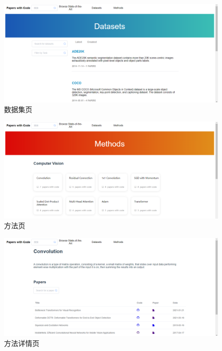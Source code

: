 \begin{figure}[htbp!]
    \centering
    \includegraphics[width=\textwidth]{figures/dataset.png}
    \caption{数据集页}
    \label{fig:dataset}
\end{figure}

\begin{figure}[htbp!]
    \centering
    \includegraphics[width=\textwidth]{figures/method.png}
    \caption{方法页}
    \label{fig:method}
\end{figure}

\begin{figure}[htbp!]
    \centering
    \includegraphics[width=\textwidth]{figures/methoddetail.png}
    \caption{方法详情页}
    \label{fig:methoddetail}
\end{figure}

